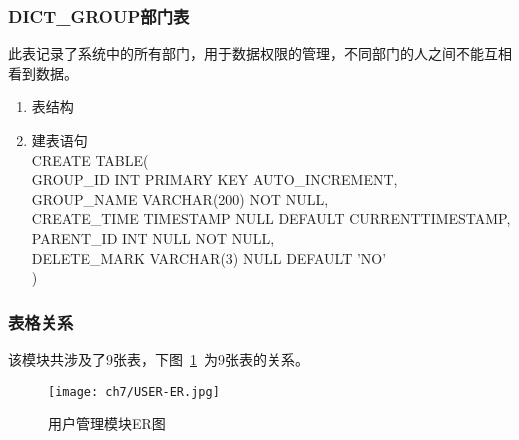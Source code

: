     \subsubsection{DICT\_GROUP部门表}
    此表记录了系统中的所有部门，用于数据权限的管理，不同部门的人之间不能互相看到数据。
    \begin{enumerate}
        \item 表结构
        \begin{table}[htbp]
            \centering
            \end{table}
        \item 建表语句\\
            CREATE TABLE(\\
                GROUP\_ID INT PRIMARY KEY AUTO\_INCREMENT,\\
                GROUP\_NAME VARCHAR(200) NOT NULL, \\
                CREATE\_TIME TIMESTAMP NULL DEFAULT CURRENTTIMESTAMP,\\
                PARENT\_ID INT NULL NOT NULL, \\            
                DELETE\_MARK VARCHAR(3) NULL DEFAULT 'NO'\\
            )
        \end{enumerate}

\subsubsection{表格关系}
该模块共涉及了9张表，下图~\ref{fig:USER-ER}~为9张表的关系。
\begin{figure}[htbp]
    \centering
    \texttt{[image: ch7/USER-ER.jpg]}
    \caption{用户管理模块ER图}\label{fig:USER-ER}
    \vspace{\baselineskip} %
\end{figure}

